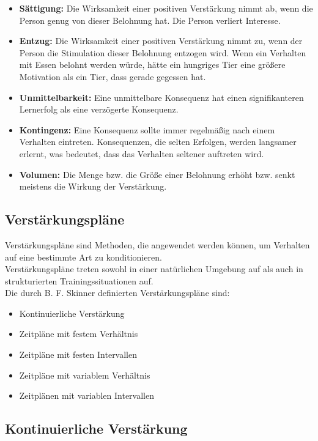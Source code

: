		\begin{itemize}
			\item \textbf{Sättigung:} Die Wirksamkeit einer positiven Verstärkung nimmt ab, wenn die Person genug von dieser Belohnung hat. Die Person verliert Interesse.
			\item \textbf{Entzug:} Die Wirksamkeit einer positiven Verstärkung nimmt zu, wenn der Person die Stimulation dieser Belohnung entzogen wird. Wenn ein Verhalten mit Essen belohnt werden würde, hätte ein hungriges Tier eine größere Motivation als ein Tier, dass gerade gegessen hat. 
			\item \textbf{Unmittelbarkeit:} Eine unmittelbare Konsequenz hat einen signifikanteren Lernerfolg als eine verzögerte Konsequenz. 
			\item \textbf{Kontingenz:} Eine Konsequenz sollte immer regelmäßig nach einem Verhalten eintreten. Konsequenzen, die selten Erfolgen, werden langsamer erlernt, was bedeutet, dass das Verhalten seltener auftreten wird. 
			\item \textbf{Volumen:} Die Menge bzw. die Größe einer Belohnung erhöht bzw. senkt meistens die Wirkung der Verstärkung. 
		\end{itemize}
		
		\subsection{Verstärkungspläne}
		
		Verstärkungspläne sind Methoden, die angewendet werden können, um Verhalten auf eine bestimmte Art zu konditionieren. \\ 
Verstärkungspläne treten sowohl in einer natürlichen Umgebung auf als auch in strukturierten Trainingssituationen auf. \\
Die durch B. F. Skinner definierten Verstärkungspläne sind: 

		\begin{itemize}
			\item Kontinuierliche Verstärkung
			\item Zeitpläne mit festem Verhältnis
			\item Zeitpläne mit festen Intervallen
			\item Zeitpläne mit variablem Verhältnis
			\item Zeitplänen mit variablen Intervallen
		\end{itemize}
		
		\subsection{Kontinuierliche Verstärkung}
		
